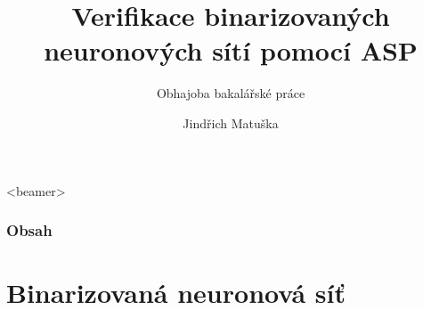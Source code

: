 \documentclass{beamer}
\title{Verifikace binarizovaných neuronových sítí pomocí ASP} %
\subtitle{Obhajoba bakalářské práce} %
\author{Jindřich Matuška}
\begin{document}
    \shorthandoff{-}
    \frame[c]{\maketitle}


    \begin{frame}<beamer>
        \frametitle{Obsah}
        \tableofcontents
    \end{frame}
    
    \section{Binarizovaná neuronová síť}
\end{document}
